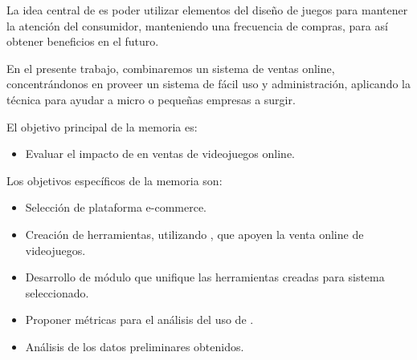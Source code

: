 La idea central de  {\GAM} es poder utilizar elementos del diseño de juegos
para mantener la atención del consumidor, manteniendo una frecuencia de compras,
para así obtener beneficios en el futuro.

En el presente trabajo, combinaremos un sistema de ventas online, concentrándonos
en proveer un sistema de fácil uso y administración, aplicando la técnica {\GAM}
para ayudar a micro o pequeñas empresas a surgir.

El objetivo principal de la memoria es:

\begin{itemize}
    \item Evaluar el impacto de {\GAM} en ventas de videojuegos online.
\end{itemize}

Los objetivos específicos de la memoria son:
\begin{itemize}
    \item Selección de plataforma e-commerce.
    \item Creación de herramientas, utilizando {\GAM}, que apoyen la
          venta online de videojuegos.
    \item Desarrollo de módulo que unifique las herramientas creadas para sistema
          seleccionado.
    \item Proponer métricas para el análisis del uso de {\GAM}.
    \item Análisis de los datos preliminares obtenidos.
\end{itemize}

